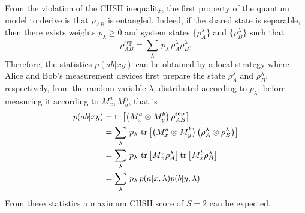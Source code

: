 From the violation of the CHSH inequality, the first property of the quantum model to derive is that $\rho_{AB}$ is entangled.
Indeed, if the shared state is separable, then there exists weights $p_\lambda\geq 0$ and system states $\{\rho_{A}^\lambda\}$ and $\{\rho_{B}^\lambda\}$ such that
\begin{equation}
	\rho_{AB}^\text{sep} = \sum_\lambda\, p_\lambda\, \rho_{A}^\lambda \rho_B^\lambda.
\end{equation}
Therefore, the statistics $p(ab|xy)$ can be obtained by a local strategy where Alice and Bob's measurement devices first prepare the state $\rho_A^\lambda$ and $\rho_B^\lambda$, respectively, from the random variable $\lambda$, distributed according to $p_\lambda$, before measuring it according to $M^a_x,M_b^y$, that is
\begin{equation}
	\begin{split}
		p(ab|xy) &= \trr{\left(M^a_x \otimes M^b_y \right) \rho_{AB}^\text{sep}}  \\
				 & = \sum_\lambda\, p_\lambda \, \trr{\left(M^a_x \otimes M^b_y \right)\left(\rho_{A}^\lambda \otimes \rho_B^\lambda\right)} \\
				 & = \sum_\lambda\, p_\lambda\, \trr{M^a_x \rho_A^\lambda} \trr{M^b_x \rho_B^\lambda} \\
				 & = \sum_\lambda\, p_\lambda\, p(a|x,\lambda) p(b|y,\lambda)
	\end{split}
	\label{eq:}
\end{equation}
From these statistics a maximum CHSH score of $S=2$ can be expected.

\medbreak

